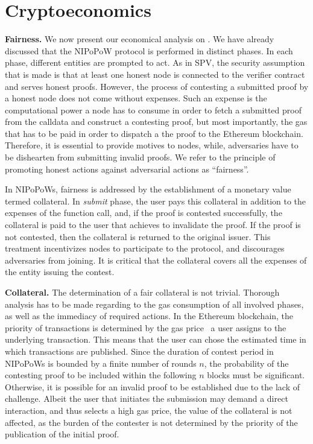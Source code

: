 \section{Cryptoeconomics}

\textbf{Fairness.} We now present our economical analysis on \name. We have
already discussed that the NIPoPoW protocol is performed in distinct phases. In
each phase, different entities are prompted to act. As in SPV, the security
assumption that is made is that at least one honest node is connected to the
verifier contract and serves honest proofs. However, the process of contesting
a submitted proof by a honest node does not come without expenses.  Such an
expense is the computational power a node has to consume in order to fetch a
submitted proof from the calldata and construct a contesting proof, but most
importantly, the gas that has to be paid in order to dispatch a the proof to
the Ethereum blockchain. Therefore, it is essential to provide motives to
nodes, while, adversaries have to be dishearten from
submitting invalid proofs.  We refer to the principle of promoting honest
actions against adversarial actions as ``fairness''.

In NIPoPoWs, fairness is addressed by the establishment of a monetary value
termed collateral. In \emph{submit} phase, the user pays this collateral in
addition to the expenses of the function call, and, if the proof is contested
successfully, the collateral is paid to the user that achieves to invalidate
the proof. If the proof is not contested, then the collateral is returned to
the original issuer. This treatment incentivizes nodes to participate to the
protocol, and discourages adversaries from joining. It is critical that the
collateral covers all the expenses of the entity issuing the contest.

\noindent \textbf{Collateral.} The determination of a fair collateral is not
trivial. Thorough analysis has to be made regarding to the gas consumption of
all involved phases, as well as the immediacy of required actions. In the
Ethereum blockchain, the priority of transactions is determined by the gas
price~\cite{wood} a user assigns to the underlying transaction. This means that
the user can chose the estimated time in which transactions are published.
Since the duration of contest period in NIPoPoWs is bounded by a finite number
of rounds $n$, the probability of the contesting proof to be included within the
following $n$ blocks must be significant. Otherwise, it is possible for an invalid
proof to be established due to the lack of challenge. Albeit the user that
initiates the submission may demand a direct interaction, and thus selects a
high gas price, the value of the collateral is not affected, as the burden
of the contester is not determined by the priority of the publication of the initial
proof.

